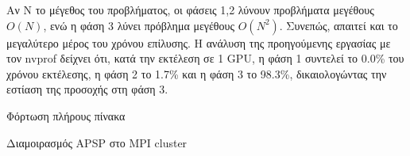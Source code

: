 \documentclass[a4paper,10pt]{article}
\begin{document}
  Αν N το μέγεθος του προβλήματος, οι φάσεις 1,2 λύνουν προβλήματα μεγέθους $O(N)$, ενώ η φάση 3 λύνει πρόβλημα μεγέθους $O(N^2)$. Συνεπώς, απαιτεί και το μεγαλύτερο μέρος του χρόνου επίλυσης. Η ανάλυση της προηγούμενης εργασίας με τον nvprof δείχνει ότι, κατά την εκτέλεση σε 1 GPU, η φάση 1 συντελεί το 0.0\% του χρόνου εκτέλεσης, η φάση 2 το 1.7\% και η φάση 3 το 98.3\%, δικαιολογώντας την εστίαση της προσοχής στη φάση 3.

  \begin{algorithm}

    Φόρτωση πλήρους πίνακα\;
	\caption{Διαμοιρασμός APSP στο MPI cluster \label{algo:mpi-apsp}}
  \end{algorithm}
\end{document}
